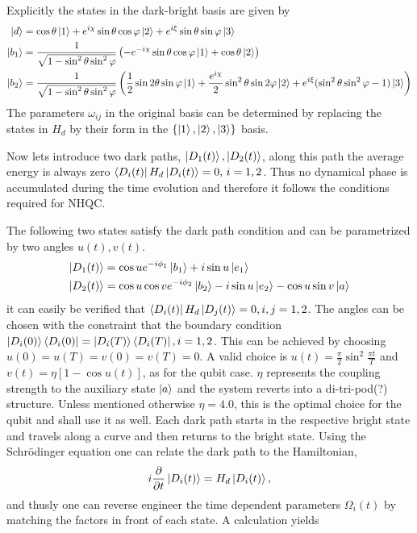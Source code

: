 Explicitly the states in the dark-bright basis are given by 
\begin{equation}
\label{eq:states}
\begin{aligned}
\ket{d} &= \cos\theta\ket{1} + e^{i\chi}\sin\theta\cos\varphi\ket{2} + e^{i\xi}\sin\theta\sin\varphi\ket{3}
\\
\ket{b_1} &= \frac{1}{\sqrt{1-\sin^2\theta\sin^2\varphi}} \left(-e^{-i\chi}\sin\theta\cos\varphi\ket{1} + \cos\theta\ket{2} \right)
\\
\ket{b_2} &= \frac{1}{\sqrt{1-\sin^2\theta\sin^2\varphi}} \left(\frac{1}{2}\sin 2\theta\sin\varphi\ket{1} + \dfrac{e^{i\chi}}{2}\sin^2\theta\sin 2\varphi\ket{2} + e^{i\xi}(\sin^2\theta\sin^2\varphi - 1)\ket{3}\right)
\end{aligned}
\end{equation}
The parameters $\omega_{ij}$ in the original basis can be determined by replacing the states in $H_d$ by their form in the $\{\ket{1},\ket{2},\ket{3}\}$ basis.

Now lets introduce two dark paths, $\ket{D_1(t)},\ket{D_2(t)}$, along this path the average energy is always zero $\bra{D_i(t)}H_d\ket{D_i(t)} = 0,\,i = 1,2$. Thus no dynamical phase is accumulated during the time evolution and therefore it follows the conditions required for NHQC.

The following two states satisfy the dark path condition and can be parametrized by two angles $u(t), v(t)$.
\begin{equation}
\label{eq:dpaths}
\begin{aligned}
\ket{D_1(t)} &= \cos u e^{-i\phi_1}\ket{b_1} + i\sin u \ket{e_1}
\\
\ket{D_2(t)} &= \cos u\cos v e^{-i\phi_2}\ket{b_2} - i\sin u \ket{e_2} - \cos u\sin v \ket{a}
\end{aligned}
\end{equation}
it can easily be verified that $\bra{D_i(t)}H_d\ket{D_j(t)} = 0, i,j = 1,2$. The angles can be chosen with the constraint that the boundary condition $\ket{D_i(0)}\bra{D_i(0)} = \ket{D_i(T)}\bra{D_i(T)}, i = 1,2$. This can be achieved by choosing $u(0) = u(T) = v(0) = v(T) = 0$. A valid choice is $u(t) = \frac{\pi}{2}\sin^2\frac{\pi t}{T}$ and $v(t) = \eta\left[1 - \cos u(t)\right]$, as for the qubit case\cite{darkpath}. $\eta$ represents the coupling strength to the auxiliary state $\ket{a}$ and the system reverts into a di-tri-pod(?) structure. Unless mentioned otherwise $\eta = 4.0$, this is the optimal choice for the qubit and shall use it as well\cite{darkpath}. Each dark path starts in the respective bright state and travels along a curve and then returns to the bright state. Using the Schrödinger equation one can relate the dark path to the Hamiltonian,
\begin{equation}
i\pdv{}{t}\ket{D_i(t)} = H_d\ket{D_i(t)},
\end{equation}
and thusly one can reverse engineer the time dependent parameters $\Omega_i(t)$ by matching the factors in front of each state. A calculation yields 

